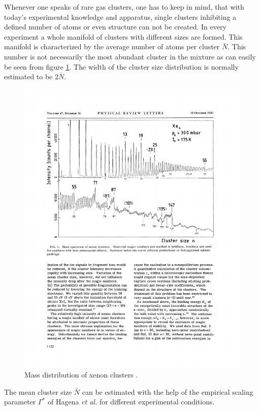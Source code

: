 Whenever one speaks of rare gas clusters, one has to keep in mind, that
with today's experimental knowledge and apparatus, single clusters
inhibiting a defined number of atoms or even structure can not be created.
In every experiment a whole manifold of clusters with different sizes are
formed. This manifold is characterized by the average number of atoms
per cluster $\bar{N}$. This number is not necessarily the most abundant
cluster in the mixture as can easily be seen from
figure \ref{figure:Xe_cluster_mass}.
The width of the cluster size distribution is normally estimated to be
$2\bar{N}$.

\begin{figure}[h]
  \centering
  \includegraphics[scale=0.8]{pics/Xe_cluster_mass.pdf}
  \caption{Mass distribution of xenon clusters \cite{Echt81}.}
  \label{figure:Xe_cluster_mass}
\end{figure}

The mean cluster size $\bar{N}$ can be estimated with
the help of the empirical scaling parameter $\Gamma^*$ of Hagena \textit{et al.}
\cite{Hagena72,Hagena81} for different experimental conditions.

